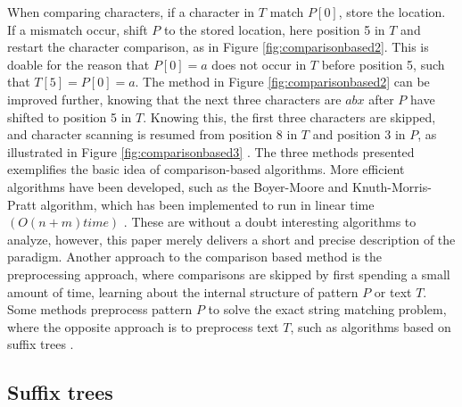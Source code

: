 \documentclass[12pt]{article} %
\begin{document}
When comparing characters, if a character in $T$ match $P[0]$, store the location. If a mismatch occur, shift $P$ to the stored location, here position 5 in $T$ and restart the character comparison, as in Figure \ref{fig:comparisonbased2}. This is doable for the reason that $P[0]=a$ does not occur in $T$ before position 5, such that $T[5]=P[0]=a$. 
The method in Figure \ref{fig:comparisonbased2} can be improved further, knowing that the next three characters are $abx$ after $P$ have shifted to position 5 in $T$. Knowing this, the first three characters are skipped, and character scanning is resumed from position 8 in $T$ and position 3 in $P$, as illustrated in Figure \ref{fig:comparisonbased3} \cite{gusfield}. 
\newline
The three methods presented exemplifies the basic idea of comparison-based algorithms. More efficient algorithms have been developed, such as the Boyer-Moore and Knuth-Morris-Pratt algorithm, which has been implemented to run in linear time $(O(n+m) time)$ \cite{gusfield}. These are without a doubt interesting algorithms to analyze, however, this paper merely delivers a short and precise description of the paradigm.
Another approach to the comparison based method is the preprocessing approach, where comparisons are skipped by first spending a small amount of time, learning about the internal structure of pattern $P$ or text $T$. Some methods preprocess pattern $P$ to solve the exact string matching problem, where the opposite approach is to preprocess text $T$, such as algorithms based on suffix trees \cite{gusfield}.


\subsection{Suffix trees}
\end{document}
